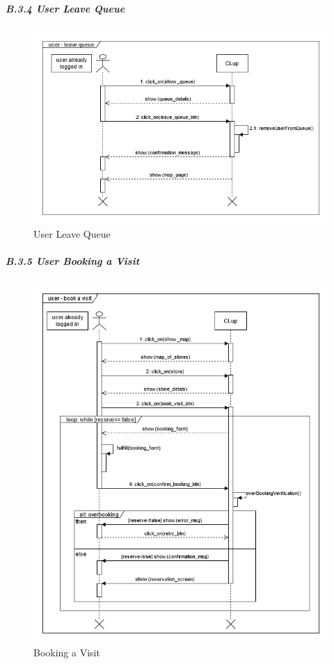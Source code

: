 \documentclass[
]{article}
\begin{document}
\hypertarget{b.3.4-user-leave-queue}{%
\subparagraph{\texorpdfstring{B.3.4 User Leave Queue
}{B.3.4 User Leave Queue }}\label{b.3.4-user-leave-queue}}

\begin{figure}
\centering
\includegraphics{assets/rasd/sequence_diagrams/sequence_diagram_user_leave_queue.jpg}
\caption{User Leave Queue}
\end{figure}

\hypertarget{b.3.5-user-booking-a-visit}{%
\subparagraph{\texorpdfstring{B.3.5 User Booking a Visit
}{B.3.5 User Booking a Visit }}\label{b.3.5-user-booking-a-visit}}

\begin{figure}
\centering
\includegraphics{assets/rasd/sequence_diagrams/sequence_diagram_user_booking.jpg}
\caption{Booking a Visit}
\end{figure}
\end{document}
